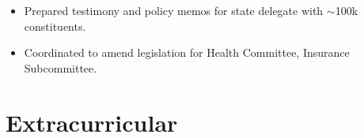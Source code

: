 \documentclass[margin, a4paper]{res}
\begin{document}
\begin{sloppypar}
\begin{resume}
\begin{itemize}
    \item Prepared testimony and policy memos for state delegate with $\sim$100k constituents. 
    \item Coordinated to amend legislation for Health Committee, Insurance Subcommittee.
\end{itemize}


\section{Extracurricular}


\end{resume}
\end{sloppypar}
\end{document}
